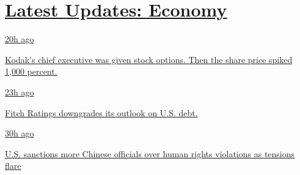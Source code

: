 \hypertarget{latest-updates-economy}{%
\section{\texorpdfstring{\href{https://www.nytimes.com/live/2020/07/31/business/stock-market-today-coronavirus?action=click\&pgtype=Article\&state=default\&region=MAIN_CONTENT_1\&context=storylines_live_updates}{Latest
Updates:
Economy}}{Latest Updates: Economy}}\label{latest-updates-economy}}

\href{https://www.nytimes.com/live/2020/07/31/business/stock-market-today-coronavirus?action=click\&pgtype=Article\&state=default\&region=MAIN_CONTENT_1\&context=storylines_live_updates\#kodaks-chief-executive-was-given-stock-options-then-the-share-price-spiked-1000-percent}{20h
ago}

\href{https://www.nytimes.com/live/2020/07/31/business/stock-market-today-coronavirus?action=click\&pgtype=Article\&state=default\&region=MAIN_CONTENT_1\&context=storylines_live_updates\#kodaks-chief-executive-was-given-stock-options-then-the-share-price-spiked-1000-percent}{Kodak's
chief executive was given stock options. Then the share price spiked
1,000 percent.}

\href{https://www.nytimes.com/live/2020/07/31/business/stock-market-today-coronavirus?action=click\&pgtype=Article\&state=default\&region=MAIN_CONTENT_1\&context=storylines_live_updates\#fitch-ratings-downgrades-its-outlook-on-us-debt}{23h
ago}

\href{https://www.nytimes.com/live/2020/07/31/business/stock-market-today-coronavirus?action=click\&pgtype=Article\&state=default\&region=MAIN_CONTENT_1\&context=storylines_live_updates\#fitch-ratings-downgrades-its-outlook-on-us-debt}{Fitch
Ratings downgrades its outlook on U.S. debt.}

\href{https://www.nytimes.com/live/2020/07/31/business/stock-market-today-coronavirus?action=click\&pgtype=Article\&state=default\&region=MAIN_CONTENT_1\&context=storylines_live_updates\#us-sanctions-more-chinese-officials-over-human-rights-violations-as-tensions-flare}{30h
ago}

\href{https://www.nytimes.com/live/2020/07/31/business/stock-market-today-coronavirus?action=click\&pgtype=Article\&state=default\&region=MAIN_CONTENT_1\&context=storylines_live_updates\#us-sanctions-more-chinese-officials-over-human-rights-violations-as-tensions-flare}{U.S.
sanctions more Chinese officials over human rights violations as
tensions flare}

